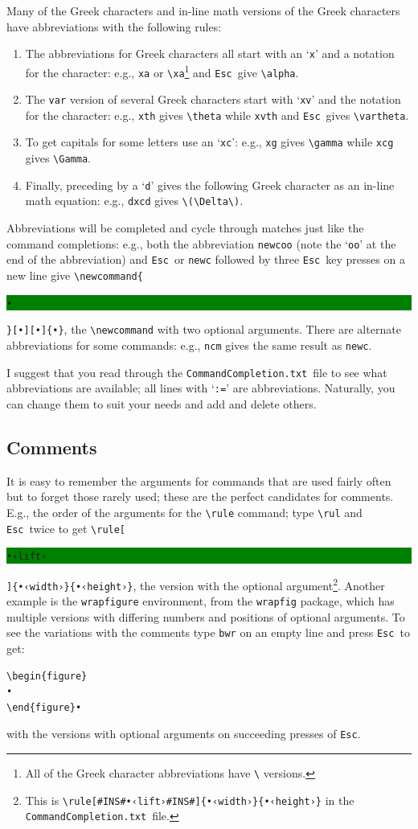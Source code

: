 \documentclass[11pt]{article}
\newcommand{\esckey}{\texttt{Esc}}
\newcommand{\selmark}{\colorbox{green}{\rule[-0.5ex]{0ex}{2.1ex}\texttt{•}}}
\newcommand{\selcomrule}{\colorbox{green}{\rule[-0.5ex]{0ex}{2.1ex}\texttt{•‹lift›}}}
\newcommand{\CCT}{\texttt{CommandCompletion.txt}}
\begin{document}
Many of the Greek characters and in-line math versions of the Greek characters have abbreviations with the following rules:
\begin{enumerate}
\item
The abbreviations for Greek characters all start with an `\texttt{x}' and a notation for the character: e.g., \verb|xa| or \verb|\xa|\footnote{All of the Greek character abbreviations have \texttt{\textbackslash} versions.} and \esckey\ give \verb|\alpha|. 
\item
The \texttt{var} version of several Greek characters start with `\texttt{xv}' and the notation for the character: e.g., \texttt{xth} gives \verb|\theta| while \verb|xvth| and \esckey\ gives \verb|\vartheta|.
\item
To get capitals for some letters use an `\texttt{xc}': e.g., \verb|xg| gives \verb|\gamma| while \verb|xcg| gives \verb|\Gamma|.
\item
Finally, preceding by a `\texttt{d}' gives the following Greek character as an in-line math equation: e.g., \verb|dxcd| gives \verb|\(\Delta\)|.
\end{enumerate}

Abbreviations will be completed and cycle through matches just like the command completions: e.g., both the abbreviation \texttt{newcoo} (note the `\texttt{oo}' at the end of the abbreviation) and \esckey\ or \texttt{newc} followed by three \esckey\ key presses on a new line give \verb|\newcommand{|\selmark\verb|}[•][•]{•}|, the \verb|\newcommand| with two optional arguments. There are alternate abbreviations for some commands: e.g., \texttt{ncm} gives the same result as \texttt{newc}.

I suggest that you read through the \CCT\ file to see what abbreviations are available; all lines with `\kern-1.7pt\texttt{:=}' are abbreviations. Naturally, you can change them to suit your needs and add and delete others.

\subsection*{Comments}

It is easy to remember the arguments for commands that are used fairly often but to forget those rarely used; these are the perfect candidates for comments. E.g., the order of the arguments for the \verb|\rule| command; type \verb|\rul| and \esckey\ twice to get \verb|\rule[|\selcomrule\verb|]{•‹width›}{•‹height›}|, the version with the optional argument\footnote{This is \texttt{\textbackslash rule[\#INS\#•‹lift›\#INS\#]\{•‹width›\}\{•‹height›\}} in the \CCT\ file.}. Another example is the \texttt{wrapfigure} environment, from the \texttt{wrapfig} package, which has multiple versions with differing numbers and positions of optional arguments. To see the variations with the comments type \texttt{bwr} on an empty line and press \esckey\ to get:
\begin{verbatim}
\begin{figure}
•
\end{figure}•
\end{verbatim}
with the versions with optional arguments on succeeding presses of \esckey.
\end{document}
